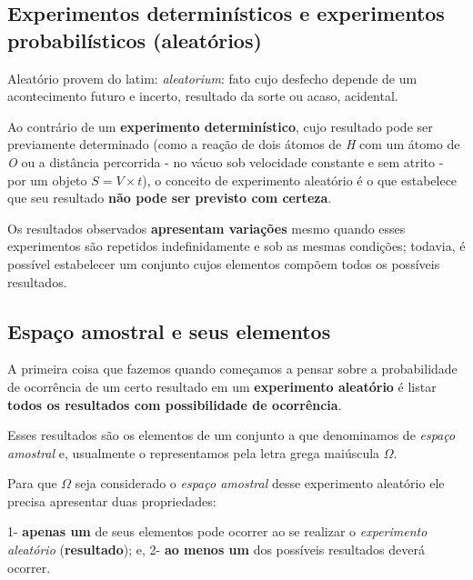 \documentclass[
]{book}
\begin{document}
\hypertarget{experimentos-determinuxedsticos-e-experimentos-probabiluxedsticos-aleatuxf3rios}{%
\subsection{Experimentos determinísticos e experimentos probabilísticos (aleatórios)}\label{experimentos-determinuxedsticos-e-experimentos-probabiluxedsticos-aleatuxf3rios}}

Aleatório provem do latim: \emph{aleatorium}: fato cujo desfecho depende de um acontecimento futuro e incerto, resultado da sorte ou acaso, acidental.

\hfill\break

Ao contrário de um \textbf{experimento determinístico}, cujo resultado pode ser previamente determinado (como a reação de dois átomos de \emph{H} com um átomo de \emph{O} ou a distância percorrida - no vácuo sob velocidade constante e sem atrito - por um objeto \(S = V \times t\)), o conceito de experimento aleatório é o que estabelece que seu resultado \textbf{não pode ser previsto com certeza}.

Os resultados observados \textbf{apresentam variações} mesmo quando esses experimentos são repetidos indefinidamente e sob as mesmas condições; todavia, é possível estabelecer um conjunto cujos elementos compõem todos os possíveis resultados.

\hypertarget{espauxe7o-amostral-e-seus-elementos}{%
\subsection{Espaço amostral e seus elementos}\label{espauxe7o-amostral-e-seus-elementos}}

A primeira coisa que fazemos quando começamos a pensar sobre a probabilidade de ocorrência de um certo resultado em um \textbf{experimento aleatório} é listar \textbf{todos os resultados com possibilidade de ocorrência}.

Esses resultados são os elementos de um conjunto a que denominamos de \emph{espaço amostral} e, usualmente o representamos pela letra grega maiúscula \(\Omega\).

Para que \(\Omega\) seja considerado o \emph{espaço amostral} desse experimento aleatório ele precisa apresentar duas propriedades:

1- \textbf{apenas um} de seus elementos pode ocorrer ao se realizar o \emph{experimento aleatório} (\textbf{resultado}); e,
2- \textbf{ao menos um} dos possíveis resultados deverá ocorrer.
\end{document}
